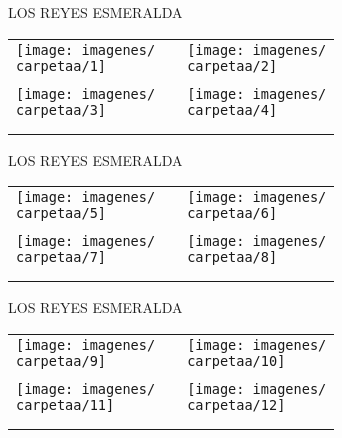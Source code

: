 \documentclass[10pt,letter]{report}
\begin{document}
\begin{center}
	\textcolor{principal}{LOS REYES ESMERALDA}
\end{center}
\begin{table}[H]
\centering

\footnotesize
	\begin{tabular}{m{7cm}m{1cm}m{7cm}}
	
	\texttt{[image: imagenes/\\carpetaa/1]}&&\texttt{[image: imagenes/\\carpetaa/2]}
	\\
	\\
	\texttt{[image: imagenes/\\carpetaa/3]}&&\texttt{[image: imagenes/\\carpetaa/4]}\\
	\\
	\\

	
	\end{tabular}
	
\end{table}
\newpage

\begin{center}
	\textcolor{principal}{LOS REYES ESMERALDA}
\end{center}
\begin{table}[H]
\centering

\footnotesize
	\begin{tabular}{m{7cm}m{1cm}m{7cm}}
	
	\texttt{[image: imagenes/\\carpetaa/5]}&&\texttt{[image: imagenes/\\carpetaa/6]}
	\\
	\\
	\texttt{[image: imagenes/\\carpetaa/7]}&&\texttt{[image: imagenes/\\carpetaa/8]}\\
	\\
	\\

	
	\end{tabular}
	
\end{table}
\newpage

\begin{center}
	\textcolor{principal}{LOS REYES ESMERALDA}
\end{center}
\begin{table}[H]
\centering

\footnotesize
	\begin{tabular}{m{7cm}m{1cm}m{7cm}}
	
	\texttt{[image: imagenes/\\carpetaa/9]}&&\texttt{[image: imagenes/\\carpetaa/10]}
	\\
	\\
	\texttt{[image: imagenes/\\carpetaa/11]}&&\texttt{[image: imagenes/\\carpetaa/12]}\\
	\\
	\\

	
	\end{tabular}
	
\end{table}
\newpage
\end{document}
